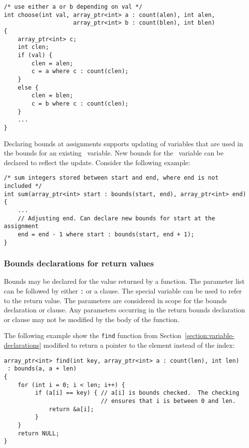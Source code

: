 \begin{verbatim}
/* use either a or b depending on val */
int choose(int val, array_ptr<int> a : count(alen), int alen,
                    array_ptr<int> b : count(blen), int blen) 
{
    array_ptr<int> c;
    int clen;
    if (val) {
        clen = alen;
        c = a where c : count(clen);
    }
    else {
        clen = blen;
        c = b where c : count(clen);
    }    
    ...
}
\end{verbatim}

Declaring bounds at assignments supports updating of variables that are
used in the bounds for an existing \arrayptr\ variable. New
bounds for the \arrayptr\ variable can be declared to reflect
the update. Consider the following example:

\begin{verbatim}
/* sum integers stored between start and end, where end is not included */
int sum(array_ptr<int> start : bounds(start, end), array_ptr<int> end)
{ 
    ...
    // Adjusting end. Can declare new bounds for start at the assignment
    end = end - 1 where start : bounds(start, end + 1);
}
\end{verbatim}

\subsubsection{Bounds declarations for return values}

Bounds may be declared for the value returned by a function. The
parameter list can be followed by either \texttt{:}  or
a  clause. The special variable  can
be used to refer to the return value. The parameters are considered in
scope for the bounds declaration or  clause. Any parameters
occurring in the return bounds declaration or  clause may
not be modified by the body of the function.

The following example show the \texttt{find} function from
Section~\ref{section:variable-declarations} modified
to return a pointer to the element instead of the index:

\begin{verbatim}
array_ptr<int> find(int key, array_ptr<int> a : count(len), int len)
 : bounds(a, a + len)
{
    for (int i = 0; i < len; i++) {
         if (a[i] == key) { // a[i] is bounds checked.  The checking
                            // ensures that i is between 0 and len.
             return &a[i];
         }
    }
    return NULL;
}
\end{verbatim}

